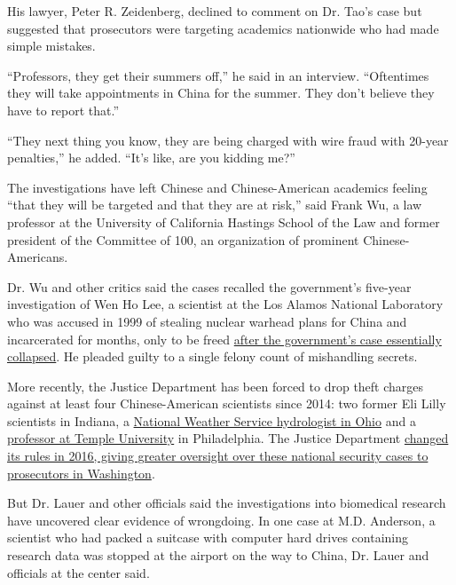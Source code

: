 His lawyer, Peter R. Zeidenberg, declined to comment on Dr. Tao's case
but suggested that prosecutors were targeting academics nationwide who
had made simple mistakes.

``Professors, they get their summers off,'' he said in an interview.
``Oftentimes they will take appointments in China for the summer. They
don't believe they have to report that.''

``They next thing you know, they are being charged with wire fraud with
20-year penalties,'' he added. ``It's like, are you kidding me?''

The investigations have left Chinese and Chinese-American academics
feeling ``that they will be targeted and that they are at risk,'' said
Frank Wu, a law professor at the University of California Hastings
School of the Law and former president of the Committee of 100, an
organization of prominent Chinese-Americans.

Dr. Wu and other critics said the cases recalled the government's
five-year investigation of Wen Ho Lee, a scientist at the Los Alamos
National Laboratory who was accused in 1999 of stealing nuclear warhead
plans for China and incarcerated for months, only to be freed
\href{https://www.nytimes3xbfgragh.onion/2001/02/04/us/the-making-of-a-suspect-the-case-of-wen-ho-lee.html}{after
the government's case essentially collapsed}. He pleaded guilty to a
single felony count of mishandling secrets.

More recently, the Justice Department has been forced to drop theft
charges against at least four Chinese-American scientists since 2014:
two former Eli Lilly scientists in Indiana, a
\href{https://www.nytimes3xbfgragh.onion/2015/05/10/business/accused-of-spying-for-china-until-she-wasnt.html}{National
Weather Service hydrologist in Ohio} and a
\href{https://www.nytimes3xbfgragh.onion/2015/09/12/us/politics/us-drops-charges-that-professor-shared-technology-with-china.html?module=inline}{professor
at Temple University} in Philadelphia. The Justice Department
\href{https://www.nytimes3xbfgragh.onion/2016/04/27/us/after-missteps-us-tightens-rules-for-national-security-cases.html}{changed
its rules in 2016, giving greater oversight over these national security
cases to prosecutors in Washington}.

But Dr. Lauer and other officials said the investigations into
biomedical research have uncovered clear evidence of wrongdoing. In one
case at M.D. Anderson, a scientist who had packed a suitcase with
computer hard drives containing research data was stopped at the airport
on the way to China, Dr. Lauer and officials at the center said.

